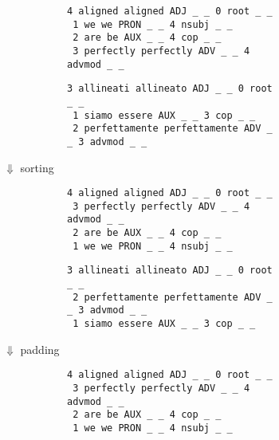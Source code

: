 \begin{figure}[H]
 \centering
 \small
 \begin{figure}[H]
  \scriptsize
  \begin{subfigure}{.46\textwidth}
  \centering
  \begin{verbatim}
4 aligned aligned ADJ _ _ 0 root _ _
 1 we we PRON _ _ 4 nsubj _ _
 2 are be AUX _ _ 4 cop _ _
 3 perfectly perfectly ADV _ _ 4 advmod _ _
  \end{verbatim}
  \end{subfigure}
  \begin{subfigure}{.5\textwidth}
  \centering
  \begin{verbatim}
3 allineati allineato ADJ _ _ 0 root _ _
 1 siamo essere AUX _ _ 3 cop _ _
 2 perfettamente perfettamente ADV _ _ 3 advmod _ _
  \end{verbatim}
  \end{subfigure}
 \end{figure}
 $\Downarrow$ sorting
 \begin{figure}[H]
  \scriptsize
  \begin{subfigure}{.46\textwidth}
  \centering
  \begin{verbatim}
4 aligned aligned ADJ _ _ 0 root _ _
 3 perfectly perfectly ADV _ _ 4 advmod _ _
 2 are be AUX _ _ 4 cop _ _
 1 we we PRON _ _ 4 nsubj _ _
\end{verbatim}
  \end{subfigure}
  \begin{subfigure}{.5\textwidth}
  \centering
  \begin{verbatim}
3 allineati allineato ADJ _ _ 0 root _ _
 2 perfettamente perfettamente ADV _ _ 3 advmod _ _
 1 siamo essere AUX _ _ 3 cop _ _
     \end{verbatim}
  \end{subfigure}
 \end{figure}
 $\Downarrow$ padding
 \begin{figure}[H]
  \scriptsize
  \begin{subfigure}{.46\textwidth}
  \centering
  \begin{verbatim}
4 aligned aligned ADJ _ _ 0 root _ _
 3 perfectly perfectly ADV _ _ 4 advmod _ _
 2 are be AUX _ _ 4 cop _ _
 1 we we PRON _ _ 4 nsubj _ _
   \end{verbatim}
  \end{subfigure}
  \begin{subfigure}{.5\textwidth}
  \centering
  \begin{Verbatim}[commandchars=\\\{\}]

\end{Verbatim}
\end{subfigure}
\end{figure}
\end{figure}
